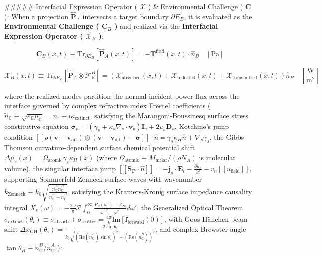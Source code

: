 \documentclass[11pt,a4paper]{article}
\theoremstyle{definition}
\theoremstyle{remark}
\begin{document}
\#\#\#\#\# Interfacial Expression Operator ( $\boldsymbol{\mathcal{X}}$ ) \& Environmental Challenge ( $\mathbf{C}$ ):
When a projection $\hat{\mathbf{P}}_A$ intersects a target boundary $\partial E_B$, it is evaluated as the \textbf{Environmental Challenge ( $\mathbf{C}_B$ )} and realized via the \textbf{Interfacial Expression Operator ( $\boldsymbol{\mathcal{X}}_B$ )}:


\begin{equation}
\boxed{\mathbf{C}_B(x, t) \equiv \mathrm{Tr}_{\partial E_B}[ \hat{\mathbf{P}}_A(x, t) ] = -\mathbf{T}^{\text{field}}(x, t) \cdot \hat{n}_B \quad [\mathrm{Pa}]}
\end{equation}



\begin{equation}
\boxed{\boldsymbol{\mathcal{X}}_B(x, t) \equiv \mathrm{Tr}_{\partial E_B}[ \hat{\mathbf{P}}_A \otimes \mathcal{F}_{\mathbb{R}}^B ] = \left( \mathcal{X}_{\text{absorbed}}(x, t) + \mathcal{X}_{\text{reflected}}(x, t) + \mathcal{X}_{\text{transmitted}}(x, t) \right) \hat{n}_B \quad [\frac{\mathrm{W}}{\mathrm{m^2}}]}
\end{equation}


where the realized modes partition the normal incident power flux across the interface governed by complex refractive index Fresnel coefficients ( $\tilde{n}_{\mathbb{C}} \equiv \sqrt{\varepsilon_{\mathbb{C}}\mu_{\mathbb{C}}} = n_r + i \kappa_{\text{extinct}}$, satisfying the Marangoni-Boussinesq surface stress constitutive equation $\boldsymbol{\sigma}_s = (\gamma_s + \kappa_s \nabla_s \cdot \mathbf{v}_s)\mathbf{I}_s + 2\mu_s \mathbf{D}_s$, Kotchine's jump condition $[\![\rho(\mathbf{v}-\mathbf{v}_{\text{int}})\otimes(\mathbf{v}-\mathbf{v}_{\text{int}}) - \boldsymbol{\sigma}]\!]\cdot\hat{n} = \gamma_s \kappa_H \hat{n} + \nabla_s \gamma_s$, the Gibbs-Thomson curvature-dependent surface chemical potential shift $\Delta \mu_s(x) = \Omega_{\text{atomic}} \gamma_s \kappa_H(x)$ (where $\Omega_{\text{atomic}} \equiv M_{\text{molar}}/(\rho N_A)$ is molecular volume), the singular interface jump $[\![\mathbf{S}_{\mathbf{P}}\cdot\hat{n}]\!] = -\mathbf{j}_s\cdot\mathbf{E}_t - \frac{\partial u_s}{\partial t} - v_n[\![u_{\text{field}}]\!]$, supporting Sommerfeld-Zenneck surface waves with wavenumber $k_{\text{Zenneck}} \equiv k_0 \sqrt{\frac{\tilde{n}_{\mathbb{C}}^A \tilde{n}_{\mathbb{C}}^B}{\tilde{n}_{\mathbb{C}}^A + \tilde{n}_{\mathbb{C}}^B}}$, satisfying the Kramers-Kronig surface impedance causality integral $X_s(\omega) = -\frac{2\omega}{\pi}\mathcal{P} \int_0^\infty \frac{R_s(\omega') - Z_\infty}{\omega'^2 - \omega^2}d\omega'$, the Generalized Optical Theorem $\sigma_{\text{extinct}}(\theta_i) \equiv \sigma_{\text{absorb}} + \sigma_{\text{scatter}} = \frac{4\pi}{k}\mathrm{Im}[\mathbf{f}_{\text{forward}}(0)]$, with Goos-Hänchen beam shift $\Delta x_{\text{GH}}(\theta_i) = \frac{2\sin\theta_i}{k_0 \sqrt{(\mathrm{Re}(\tilde{n}_{\mathbb{C}}^A)\sin\theta_i)^2 - (\mathrm{Re}(\tilde{n}_{\mathbb{C}}^B))^2}}$, and complex Brewster angle $\tan\theta_B \equiv \tilde{n}_{\mathbb{C}}^B / \tilde{n}_{\mathbb{C}}^A$ ):
\end{document}
